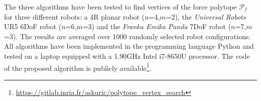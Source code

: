 



The three algorithms have been tested to find vertices of the force polytope $\mathcal{P}_f$ for three different robots: a 4R planar robot ($n$=$4$,$m$=$2$), the \textit{Universal Robots} UR5 6DoF robot ($n$=$6$,$m$=$3$) and the \textit{Franka Emika Panda} 7DoF robot ($n$=$7$,$m$=$3$). The results are averaged over 1000 randomly selected robot configurations. All algorithms have been implemented in the programming language Python and tested on a laptop equipped with a 1.90GHz Intel i7-8650U processor. The code of the proposed algorithm is publicly available\footnote{ \url{https://gitlab.inria.fr/askuric/polytope\_vertex\_search}}.

